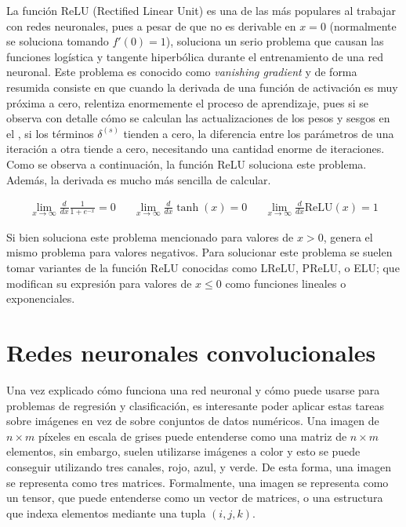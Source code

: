 \begin{itemize}
				La función ReLU (Rectified Linear Unit) es una de las más populares al trabajar con redes neuronales, pues a pesar de que no es derivable en $x = 0$ (normalmente se soluciona tomando $f'(0) = 1$), soluciona un serio problema que causan las funciones logística y tangente hiperbólica durante el entrenamiento de una red neuronal. Este problema es conocido como \textit{vanishing gradient} y de forma resumida consiste en que cuando la derivada de una función de activación es muy próxima a cero, relentiza enormemente el proceso de aprendizaje, pues si se observa con detalle cómo se calculan las actualizaciones de los pesos y sesgos en el , si los términos $\delta^{(s)}$ tienden a cero, la diferencia entre los parámetros de una iteración a otra tiende a cero, necesitando una cantidad enorme de iteraciones. Como se observa a continuación, la función ReLU soluciona este problema. Además, la derivada es mucho más sencilla de calcular. 
				
				\begin{align*}
					\lim_{x\to\infty}\frac{d}{dx}\frac{1}{1+e^{-x}} = 0 && \lim_{x\to\infty}\frac{d}{dx}\tanh(x) = 0 && \lim_{x\to\infty}\frac{d}{dx}\text{ReLU}(x) = 1
				\end{align*}
				
				Si bien soluciona este problema mencionado para valores de $x > 0$, genera el mismo problema para valores negativos. Para solucionar este problema se suelen tomar variantes de la función ReLU conocidas como LReLU, PReLU, o ELU; que modifican su expresión para valores de $x \leq 0$ como funciones lineales o exponenciales. 
				
			\end{itemize}
			
		\section{Redes neuronales convolucionales}
		
			Una vez explicado cómo funciona una red neuronal y cómo puede usarse para problemas de regresión y clasificación, es interesante poder aplicar estas tareas sobre imágenes en vez de sobre conjuntos de datos numéricos. Una imagen de $n \times m$ píxeles en escala de grises puede entenderse como una matriz de $n \times m$ elementos, sin embargo, suelen utilizarse imágenes a color y esto se puede conseguir utilizando tres canales, rojo, azul, y verde. De esta forma, una imagen se representa como tres matrices. Formalmente, una imagen se representa como un tensor, que puede entenderse como un vector de matrices, o una estructura que indexa elementos mediante una tupla $(i, j, k)$.\\
			
